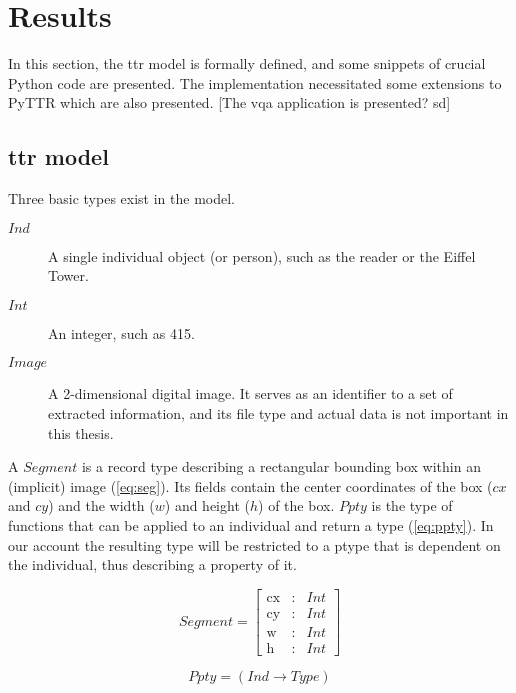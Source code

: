 \section{Results}
\label{sec:results}

In this section, the \gls{ttr} model is formally defined, and some snippets of crucial Python code are presented.
The implementation necessitated some extensions to PyTTR which are also presented.
[The vqa application is presented? sd]



\subsection{\Gls{ttr} model}

Three basic types exist in the model.

\begin{description}
\item [$Ind$] A single individual object (or person), such as the reader or the Eiffel Tower.
\item [$Int$] An integer, such as 415.
\item [$Image$] A 2-dimensional digital image. It serves as an identifier to a set of extracted information, and its file type and actual data is not important in this thesis.
\end{description}

A $Segment$ is a record type describing a rectangular bounding box within an (implicit) image (\autoref{eq:seg}).
Its fields contain the center coordinates of the box ($cx$ and $cy$) and the width ($w$) and height ($h$) of the box.
$Ppty$ is the type of functions that can be applied to an individual and return a type (\autoref{eq:ppty}).
In our account the resulting type will be restricted to a ptype that is dependent on the individual, thus describing a property of it.

\begin{equation}\label{eq:seg}
Segment = \left[\begin{array}{rcl}
\text{cx} &:& Int\\
\text{cy} &:& Int\\
\text{w} &:& Int\\
\text{h} &:& Int
\end{array}\right]\end{equation}

\begin{equation}\label{eq:ppty}
Ppty = (Ind \rightarrow Type)\end{equation}


